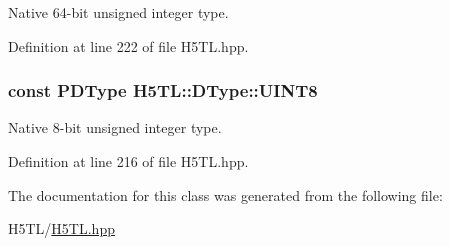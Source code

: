 Native 64-\/bit unsigned integer type. 



Definition at line 222 of file H5\-T\-L.\-hpp.

\hypertarget{class_h5_t_l_1_1_d_type_a6e37c76bcf8cea8511e8ef6fbafb269b}{
\subsubsection[{U\-I\-N\-T8}]{\setlength{\rightskip}{0pt plus 5cm}const {\bf P\-D\-Type} H5\-T\-L\-::\-D\-Type\-::\-U\-I\-N\-T8\hspace{0.3cm}{\ttfamily [static]}}}\label{class_h5_t_l_1_1_d_type_a6e37c76bcf8cea8511e8ef6fbafb269b}


Native 8-\/bit unsigned integer type. 



Definition at line 216 of file H5\-T\-L.\-hpp.



The documentation for this class was generated from the following file\-:\begin{DoxyCompactItemize}
\item 
H5\-T\-L/\hyperlink{_h5_t_l_8hpp}{H5\-T\-L.\-hpp}\end{DoxyCompactItemize}
